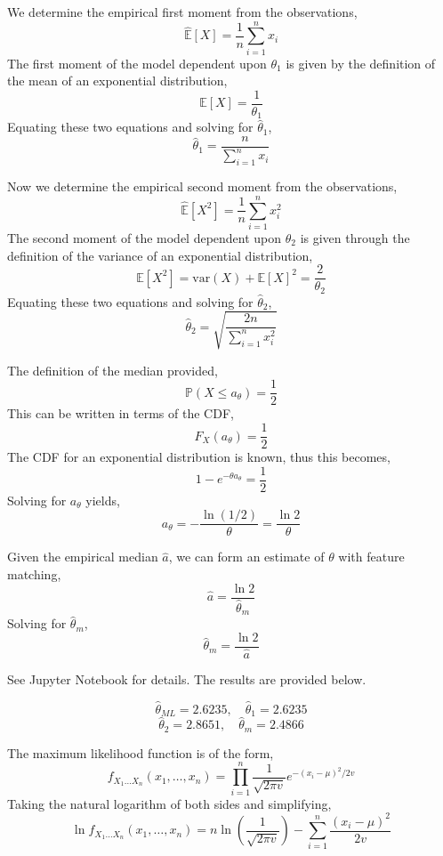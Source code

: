 \documentclass[12pt,twoside]{article}
\begin{document}
\begin{problems}
\begin{problemparts}
\problempart %
We determine the empirical first moment from the observations,
$$ \hat{\mathbb{E}}[X] = \frac{1}{n} \sum_{i = 1}^n x_i $$
The first moment of the model dependent upon $\theta_1$ is given by the
definition of the mean of an exponential distribution,
$$ \mathbb{E}[X] = \frac{1}{\theta_1} $$
Equating these two equations and solving for $\hat{\theta}_1$,
$$ \hat{\theta}_1 = \frac{n}{\sum_{i = 1}^n x_i} $$

Now we determine the empirical second moment from the observations,
$$ \hat{\mathbb{E}}[X^2] = \frac{1}{n} \sum_{i = 1}^n x_i^2 $$
The second moment of the model dependent upon $\theta_2$ is given through the
definition of the variance of an exponential distribution,
$$ \mathbb{E}[X^2] = \mathrm{var}(X) + \mathbb{E}[X]^2 = \frac{2}{\theta_2} $$
Equating these two equations and solving for $\hat{\theta}_2$,
$$ \hat{\theta}_2 = \sqrt{\frac{2n}{\sum_{i = 1}^n x_i^2}} $$

\problempart %
The definition of the median provided,
$$ \mathbb{P}(X \leq a_\theta) = \frac{1}{2} $$
This can be written in terms of the CDF,
$$ F_X(a_\theta) = \frac{1}{2} $$ 
The CDF for an exponential distribution is known, thus this becomes,
$$ 1 - e^{-\theta a_\theta} = \frac{1}{2} $$
Solving for $a_\theta$ yields,
$$ a_\theta = -\frac{\ln(1/2)}{\theta} = \frac{\ln 2}{\theta} $$

Given the empirical median $\hat{a}$, we can form an estimate of $\theta$ with
feature matching,
$$ \hat{a} = \frac{\ln 2}{\hat{\theta}_m} $$
Solving for $\hat{\theta}_m$,
$$ \hat{\theta}_m = \frac{\ln 2}{\hat{a}} $$

\problempart %

See Jupyter Notebook for details. The results are provided below.

$$ \hat{\theta}_{ML} = 2.6235,\quad \hat{\theta}_{1} = 2.6235 $$
$$ \hat{\theta}_{2} = 2.8651,\quad \hat{\theta}_{m} = 2.4866 $$

\end{problemparts}

\newpage
\problem  %

\begin{problemparts}

\problempart %
The maximum likelihood function is of the form,
$$ f_{X_1\ldots X_n}(x_1, \ldots, x_n) = \prod_{i = 1}^n \frac{1}{\sqrt{2 \pi 
v}} e^{-(x_i - \mu)^2 / 2v} $$
Taking the natural logarithm of both sides and simplifying,
$$ \ln f_{X_1\ldots X_n}(x_1, \ldots, x_n) = n \ln \left(\frac{1}{\sqrt{2 \pi 
v}}\right) - \sum_{i = 1}^n \frac{(x_i - \mu)^2}{2v} $$


\end{problemparts}
\end{problems}
\end{document}
